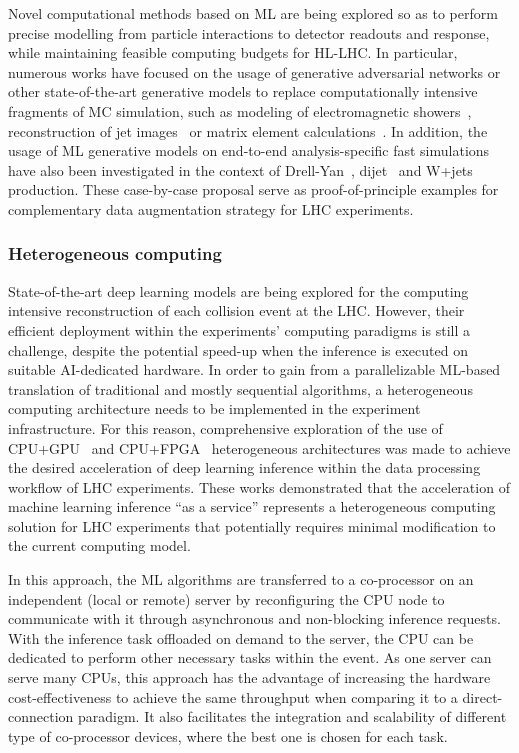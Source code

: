 Novel computational methods based on ML are being explored so as to perform precise modelling from particle interactions to detector readouts and response, while maintaining feasible computing budgets for HL-LHC. 
In particular, numerous works have focused on the usage of generative adversarial networks or other state-of-the-art generative models to replace computationally intensive fragments of MC simulation, such as modeling of electromagnetic showers~\cite{Paganini:2017dwg,Paganini:2017hrr,deOliveira:2017pjk}, reconstruction of jet images~\cite{Musella:2018rdi} or matrix element calculations~\cite{Bendavid:2017zhk}. 
In addition, the usage of ML generative models on end-to-end analysis-specific fast simulations have also been investigated in the context of Drell-Yan~\cite{Hashemi:2019fkn}, dijet~\cite{DiSipio:2019imz} and W+jets~\cite{Chen:2020uds} production. 
These case-by-case proposal serve as proof-of-principle examples for complementary data augmentation strategy for LHC experiments.

\subsubsection{Heterogeneous computing}

State-of-the-art deep learning models are being explored for the computing intensive reconstruction of each collision event at the LHC. However, their efficient deployment within the experiments' computing paradigms is still a challenge, despite the potential speed-up when the inference is executed on suitable AI-dedicated hardware. In order to gain from a parallelizable ML-based translation of traditional and mostly sequential algorithms, a heterogeneous computing architecture needs to be implemented in the experiment infrastructure. 
For this reason, comprehensive exploration of the use of CPU+GPU~\cite{Krupa:2020bwg} and CPU+FPGA~\cite{Duarte:2019fta,Rankin:2020usv} heterogeneous architectures  was made to achieve the desired acceleration of deep learning inference within the data processing workflow of LHC experiments. These works demonstrated that the acceleration of machine learning inference ``as a service'' represents a heterogeneous computing solution for LHC experiments that  potentially requires minimal modification to the current computing model. 

In this approach, the ML algorithms are transferred to a co-processor on an independent (local or remote) server by reconfiguring the CPU node to communicate with it through asynchronous and non-blocking inference requests.
With the inference task offloaded on demand to the server,  the CPU can be dedicated to perform other necessary tasks within the event.
As one server can serve many CPUs, this approach has the advantage of increasing the hardware cost-effectiveness to achieve the same throughput when comparing it to a direct-connection paradigm.
It also facilitates the integration and scalability of different type of co-processor devices, where the best one is chosen for each task. 

